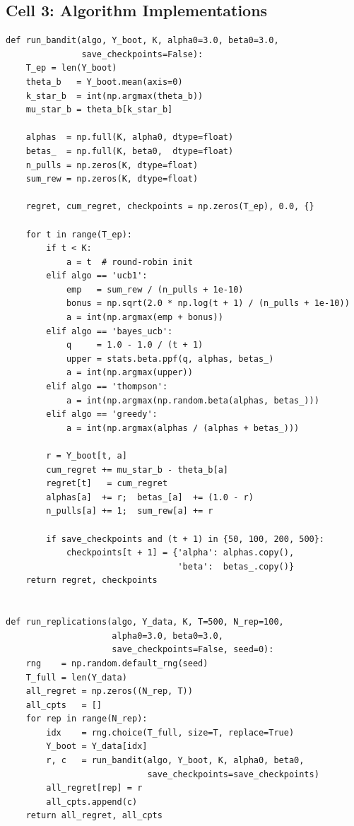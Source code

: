 \documentclass[11pt, letterpaper]{article}
\begin{document}
\subsection*{Cell 3: Algorithm Implementations}
\begin{lstlisting}
def run_bandit(algo, Y_boot, K, alpha0=3.0, beta0=3.0,
               save_checkpoints=False):
    T_ep = len(Y_boot)
    theta_b   = Y_boot.mean(axis=0)
    k_star_b  = int(np.argmax(theta_b))
    mu_star_b = theta_b[k_star_b]

    alphas  = np.full(K, alpha0, dtype=float)
    betas_  = np.full(K, beta0,  dtype=float)
    n_pulls = np.zeros(K, dtype=float)
    sum_rew = np.zeros(K, dtype=float)

    regret, cum_regret, checkpoints = np.zeros(T_ep), 0.0, {}

    for t in range(T_ep):
        if t < K:
            a = t  # round-robin init
        elif algo == 'ucb1':
            emp   = sum_rew / (n_pulls + 1e-10)
            bonus = np.sqrt(2.0 * np.log(t + 1) / (n_pulls + 1e-10))
            a = int(np.argmax(emp + bonus))
        elif algo == 'bayes_ucb':
            q     = 1.0 - 1.0 / (t + 1)
            upper = stats.beta.ppf(q, alphas, betas_)
            a = int(np.argmax(upper))
        elif algo == 'thompson':
            a = int(np.argmax(np.random.beta(alphas, betas_)))
        elif algo == 'greedy':
            a = int(np.argmax(alphas / (alphas + betas_)))

        r = Y_boot[t, a]
        cum_regret += mu_star_b - theta_b[a]
        regret[t]   = cum_regret
        alphas[a]  += r;  betas_[a]  += (1.0 - r)
        n_pulls[a] += 1;  sum_rew[a] += r

        if save_checkpoints and (t + 1) in {50, 100, 200, 500}:
            checkpoints[t + 1] = {'alpha': alphas.copy(),
                                  'beta':  betas_.copy()}
    return regret, checkpoints


def run_replications(algo, Y_data, K, T=500, N_rep=100,
                     alpha0=3.0, beta0=3.0,
                     save_checkpoints=False, seed=0):
    rng    = np.random.default_rng(seed)
    T_full = len(Y_data)
    all_regret = np.zeros((N_rep, T))
    all_cpts   = []
    for rep in range(N_rep):
        idx    = rng.choice(T_full, size=T, replace=True)
        Y_boot = Y_data[idx]
        r, c   = run_bandit(algo, Y_boot, K, alpha0, beta0,
                            save_checkpoints=save_checkpoints)
        all_regret[rep] = r
        all_cpts.append(c)
    return all_regret, all_cpts
\end{lstlisting}
\end{document}
